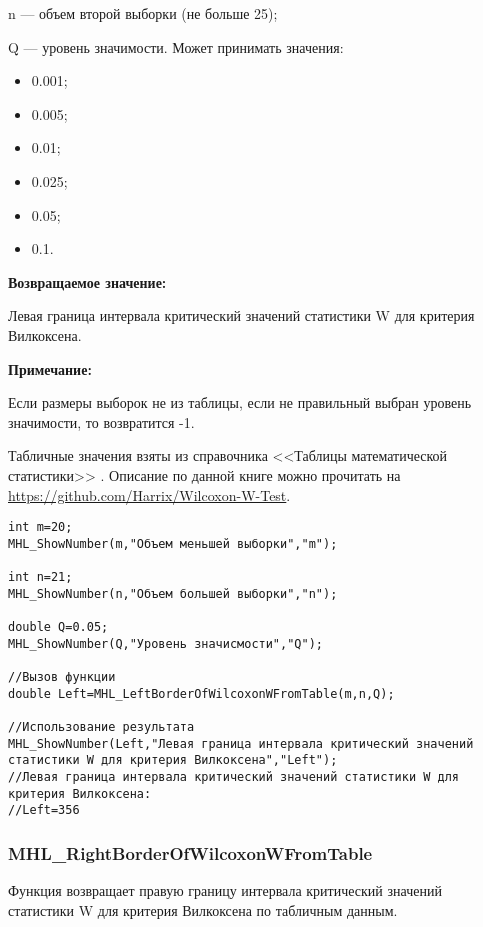 \documentclass[a4paper,12pt]{article}
\begin{document}
    n --- объем второй выборки (не больше 25);
 
    Q --- уровень значимости. Может принимать значения:
	
\begin{itemize}
\item 0.001;
\item 0.005; 
\item 0.01; 
\item 0.025; 
\item 0.05; 
\item 0.1.
\end{itemize}

\textbf{Возвращаемое значение:}

Левая граница интервала критический значений статистики W для критерия Вилкоксена.

\textbf{Примечание:}

     Если размеры выборок не из таблицы, если не правильный выбран уровень значимости, то возвратится -1.
	 
	 Табличные значения взяты из  справочника <<Таблицы математической статистики>> \cite[с. 357]{book:Bolshev1983}. Описание по данной книге можно прочитать на \href {https://github.com/Harrix/Wilcoxon-W-Test} {https://github.com/Harrix/Wilcoxon-W-Test}.



\begin{lstlisting}[label=code_use_MHL_LeftBorderOfWilcoxonWFromTable,caption=Пример использования]
int m=20;
MHL_ShowNumber(m,"Объем меньшей выборки","m");

int n=21;
MHL_ShowNumber(n,"Объем большей выборки","n");

double Q=0.05;
MHL_ShowNumber(Q,"Уровень значисмости","Q");

//Вызов функции
double Left=MHL_LeftBorderOfWilcoxonWFromTable(m,n,Q);

//Использование результата
MHL_ShowNumber(Left,"Левая граница интервала критический значений статистики W для критерия Вилкоксена","Left");
//Левая граница интервала критический значений статистики W для критерия Вилкоксена:
//Left=356
\end{lstlisting}

\subsubsection{MHL\_RightBorderOfWilcoxonWFromTable}\label{MHL_RightBorderOfWilcoxonWFromTable}

Функция возвращает правую границу интервала критический значений статистики W для критерия Вилкоксена по табличным данным.
\end{document}
